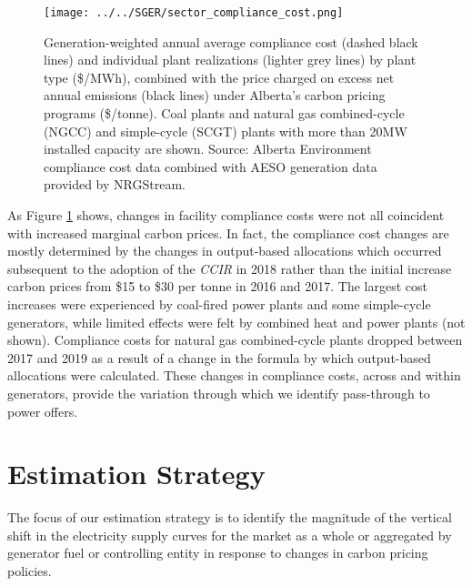 \documentclass[12pt]{article}
\newcommand{\coe}{\text{CO$_2$e }}
\begin{document}
\begin{figure}[t]%
	\centering \vspace{-.25cm} \texttt{[image: ../../SGER/sector\_compliance\_cost.png]}
\vspace{-0.75cm}	\caption{Generation-weighted annual average compliance cost (dashed black lines) and individual plant realizations (lighter grey lines) by plant type (\$/MWh), combined with the price charged on excess net annual emissions (black lines) under Alberta's carbon pricing programs (\$/tonne). Coal plants and natural gas combined-cycle (NGCC) and simple-cycle (SCGT) plants with more than 20MW installed capacity are shown. Source: Alberta Environment compliance cost data combined with AESO generation data provided by NRGStream.}
\label{fig:sector_compliance_cost}
\end{figure}

As Figure \ref{fig:sector_compliance_cost} shows, changes in facility compliance costs were not all coincident with increased marginal carbon prices. In fact, the compliance cost changes are mostly determined  by the changes in output-based allocations which occurred subsequent to the adoption of the \emph{CCIR} in 2018 rather than the initial increase carbon prices from \$15 to \$30 per tonne \coe in 2016 and 2017. The largest cost increases were experienced by coal-fired power plants and some simple-cycle generators, while limited effects were felt by combined heat and power plants (not shown). Compliance costs for natural gas combined-cycle plants dropped between 2017 and 2019 as a result of a change in the formula by which output-based allocations were calculated. These changes in compliance costs, across and within generators, provide the variation through which we identify pass-through to power offers.

\section{Estimation Strategy}
The focus of our estimation strategy is to identify the magnitude of the vertical shift in the electricity supply curves for the market as a whole or aggregated by generator fuel or controlling entity in response to changes in carbon pricing policies.
\end{document}
